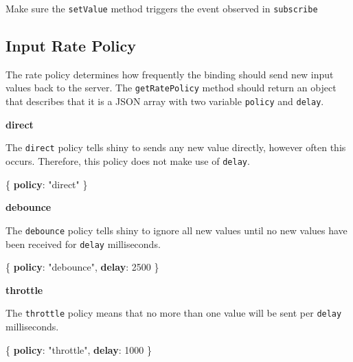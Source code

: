 \documentclass[10pt,]{krantz}
\makeatletter
\newenvironment{Shaded}{\begin{snugshade}}{\end{snugshade}}
\newcommand{\DecValTok}[1]{\textcolor[rgb]{0.06,0.06,0.06}{#1}}
\newcommand{\ErrorTok}[1]{\textcolor[rgb]{0.14,0.14,0.14}{\textbf{#1}}}
\newcommand{\FunctionTok}[1]{\textcolor[rgb]{0,0,0}{#1}}
\newcommand{\StringTok}[1]{\textcolor[rgb]{0.5,0.5,0.5}{#1}}
\newenvironment{kframe}{%
\medskip{}
\setlength{\fboxsep}{.8em}
 \def\at@end@of@kframe{}%
 \ifinner\ifhmode%
  \def\at@end@of@kframe{\end{minipage}}%
  \begin{minipage}{\columnwidth}%
 \fi\fi%
 \def\FrameCommand##1{\hskip\@totalleftmargin \hskip-\fboxsep
 \colorbox{shadecolor}{##1}\hskip-\fboxsep
     \hskip-\linewidth \hskip-\@totalleftmargin \hskip\columnwidth}%
 \MakeFramed {\advance\hsize-\width
   \@totalleftmargin\z@ \linewidth\hsize
   \@setminipage}}%
 {\par\unskip\endMakeFramed%
 \at@end@of@kframe}
\renewenvironment{Shaded}{\begin{kframe}}{\end{kframe}}
\newenvironment{rmdblock}[1]
  {
  \begin{itemize}
  \renewcommand{\labelitemi}{
    \raisebox{-.7\height}[0pt][0pt]{
      {\setkeys{Gin}{width=3em,keepaspectratio}\texttt{[image: images/\#1]}}
    }
  }
  \setlength{\fboxsep}{1em}
  \begin{kframe}
  \item
  }
  {
  \end{kframe}
  \end{itemize}
  }
\newenvironment{rmdnote}
  {\begin{rmdblock}{note}}
  {\end{rmdblock}}
\makeatother
\begin{document}
\begin{rmdnote}
Make sure the \texttt{setValue} method triggers the event observed in
\texttt{subscribe}
\end{rmdnote}

\hypertarget{shiny-input-rate-policy}{%
\subsection{Input Rate Policy}\label{shiny-input-rate-policy}}

The rate policy determines how frequently the binding should send new input values back to the server. The \texttt{getRatePolicy} method should return an object that describes that it is a JSON array with two variable \texttt{policy} and \texttt{delay}.

\textbf{direct}

The \texttt{direct} policy tells shiny to sends any new value directly, however often this occurs. Therefore, this policy does not make use of \texttt{delay}.

\begin{Shaded}
\begin{Highlighting}[]
\FunctionTok{\{}
  \ErrorTok{policy}\FunctionTok{:} \StringTok{"direct"}
\FunctionTok{\}}
\end{Highlighting}
\end{Shaded}

\textbf{debounce}

The \texttt{debounce} policy tells shiny to ignore all new values until no new values have been received for \texttt{delay} milliseconds.

\begin{Shaded}
\begin{Highlighting}[]
\FunctionTok{\{}
  \ErrorTok{policy}\FunctionTok{:} \StringTok{"debounce"}\FunctionTok{,}
  \ErrorTok{delay}\FunctionTok{:} \DecValTok{2500}
\FunctionTok{\}}
\end{Highlighting}
\end{Shaded}

\textbf{throttle}

The \texttt{throttle} policy means that no more than one value will be sent per \texttt{delay} milliseconds.

\begin{Shaded}
\begin{Highlighting}[]
\FunctionTok{\{}
  \ErrorTok{policy}\FunctionTok{:} \StringTok{"throttle"}\FunctionTok{,}
  \ErrorTok{delay}\FunctionTok{:} \DecValTok{1000}
\FunctionTok{\}}
\end{Highlighting}
\end{Shaded}
\end{document}
